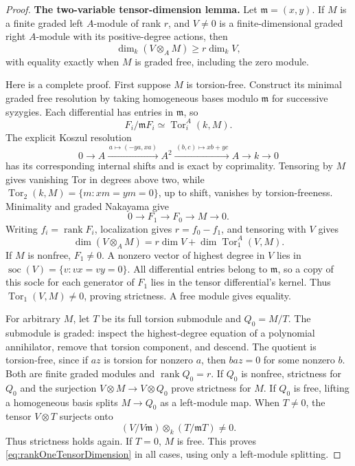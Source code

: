 \begin{proof}
\par\smallskip\noindent\textbf{The two-variable tensor-dimension lemma.}\quad
Let \(\mathfrak m=(x,y)\). If \(M\) is a finite graded
left \(A\)-module of rank \(r\), and \(V\ne0\) is a
finite-dimensional graded right \(A\)-module with its
positive-degree actions, then
\begin{equation}\label{eq:rankOneTensorDimension}
 \dim_k(V\otimes_AM)\ge r\dim_kV,
\end{equation}
with equality exactly when \(M\) is graded free,
including the zero module.

Here is a complete proof. First suppose \(M\) is
torsion-free. Construct its minimal graded free
resolution by taking homogeneous bases modulo
\(\mathfrak m\) for successive syzygies. Each differential
has entries in \(\mathfrak m\), so
\[
 F_i/\mathfrak mF_i\simeq\operatorname{Tor}_i^A(k,M).
\]
The explicit Koszul resolution
\[
 0\longrightarrow A
 \xrightarrow{\,a\mapsto(-ya,xa)\,}A^2
 \xrightarrow{\,(b,c)\mapsto xb+yc\,}A
 \longrightarrow k\longrightarrow0
\]
has its corresponding internal shifts and is exact
by coprimality. Tensoring by \(M\) gives vanishing
Tor in degrees above two, while
\(\operatorname{Tor}_2(k,M)=\{m:xm=ym=0\}\), up to
shift, vanishes by torsion-freeness.
Minimality and graded Nakayama give
\[
 0\longrightarrow F_1\longrightarrow F_0
       \longrightarrow M\longrightarrow0.
\]
Writing \(f_i=\operatorname{rank}F_i\), localization
gives \(r=f_0-f_1\), and tensoring with \(V\) gives
\begin{equation}\label{eq:rankOneTorDimension}
 \dim(V\otimes_AM)
 =r\dim V+\dim\operatorname{Tor}_1^A(V,M).
\end{equation}
If \(M\) is nonfree, \(F_1\ne0\).
A nonzero vector of highest degree in \(V\) lies in
\(\operatorname{soc}(V)=\{v:vx=vy=0\}\).
All differential entries belong to \(\mathfrak m\),
so a copy of this socle for each generator of \(F_1\)
lies in the tensor differential's kernel.
Thus \(\operatorname{Tor}_1(V,M)\ne0\), proving
strictness. A free module gives equality.

For arbitrary \(M\), let \(T\) be its full torsion
submodule and \(Q_0=M/T\). The submodule is graded:
inspect the highest-degree equation of a polynomial
annihilator, remove that torsion component, and descend.
The quotient is torsion-free, since if \(az\) is
torsion for nonzero \(a\), then \(baz=0\) for some
nonzero \(b\). Both are finite graded modules and
\(\operatorname{rank}Q_0=r\).
If \(Q_0\) is nonfree, strictness for \(Q_0\) and
the surjection \(V\otimes M\to V\otimes Q_0\) prove
strictness for \(M\).
If \(Q_0\) is free, lifting a homogeneous basis
splits \(M\to Q_0\) as a left-module map.
When \(T\ne0\), the tensor \(V\otimes T\) surjects onto
\[
 (V/V\mathfrak m)\otimes_k(T/\mathfrak mT)\ne0.
\]
Thus strictness holds again. If \(T=0\), \(M\) is
free. This proves \eqref{eq:rankOneTensorDimension}
in all cases, using only a left-module splitting.


\end{proof}
